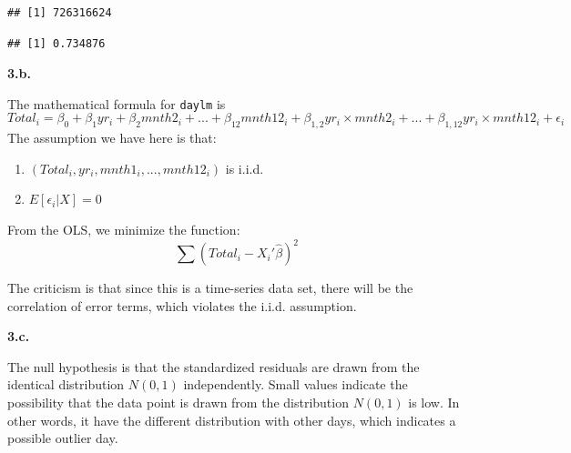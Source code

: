 \documentclass[
]{article}
\newenvironment{Shaded}{\begin{snugshade}}{\end{snugshade}}
\newcommand{\CommentTok}[1]{\textcolor[rgb]{0.56,0.35,0.01}{\textit{#1}}}
\newcommand{\DecValTok}[1]{\textcolor[rgb]{0.00,0.00,0.81}{#1}}
\newcommand{\FunctionTok}[1]{\textcolor[rgb]{0.00,0.00,0.00}{#1}}
\newcommand{\NormalTok}[1]{#1}
\newcommand{\OtherTok}[1]{\textcolor[rgb]{0.56,0.35,0.01}{#1}}
\newcommand{\SpecialCharTok}[1]{\textcolor[rgb]{0.00,0.00,0.00}{#1}}
\providecommand{\tightlist}{%
  \setlength{\itemsep}{0pt}\setlength{\parskip}{0pt}}
\begin{document}
\begin{Shaded}
\end{Shaded}

\begin{verbatim}
## [1] 726316624
\end{verbatim}

\begin{Shaded}
\end{Shaded}

\begin{verbatim}
## [1] 0.734876
\end{verbatim}

\textbf{3.b.}

The mathematical formula for \texttt{daylm} is
\[Total_i = \beta_0 + \beta_1 yr_i + \beta_2 mnth2_i+... + \beta_{12} mnth12_i+\beta_{1,2} yr_i \times mnth2_i+... + \beta_{1,12} yr_i \times mnth12_i+\epsilon_i\]
The assumption we have here is that:

\begin{enumerate}
\def\labelenumi{\arabic{enumi})}
\tightlist
\item
  \((Total_i, yr_i, mnth1_i,..., mnth12_i)\) is i.i.d.
\item
  \(E[\epsilon_i|X] = 0\)
\end{enumerate}

From the OLS, we minimize the function:
\[\sum(Total_i-X_i'\hat{\beta})^2\]

The criticism is that since this is a time-series data set, there will
be the correlation of error terms, which violates the i.i.d. assumption.

\textbf{3.c.}

The null hypothesis is that the standardized residuals are drawn from
the identical distribution \(N(0,1)\) independently. Small values
indicate the possibility that the data point is drawn from the
distribution \(N(0,1)\) is low. In other words, it have the different
distribution with other days, which indicates a possible outlier day.
\end{document}
